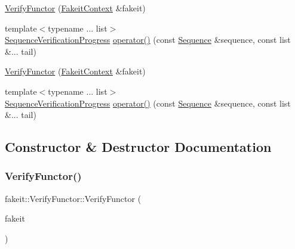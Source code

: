 \begin{DoxyCompactItemize}
\mbox{\hyperlink{classfakeit_1_1VerifyFunctor_ae85e5c4e5d0964fe41d78ffa7be7f12d}{Verify\+Functor}} (\mbox{\hyperlink{structfakeit_1_1FakeitContext}{Fakeit\+Context}} \&fakeit)
\item 
{\footnotesize template$<$typename ... list$>$ }\\\mbox{\hyperlink{classfakeit_1_1SequenceVerificationProgress}{Sequence\+Verification\+Progress}} \mbox{\hyperlink{classfakeit_1_1VerifyFunctor_a402a212d37bb558e53493cb9ab866947}{operator()}} (const \mbox{\hyperlink{classfakeit_1_1Sequence}{Sequence}} \&sequence, const list \&... tail)
\item 
\mbox{\hyperlink{classfakeit_1_1VerifyFunctor_ae85e5c4e5d0964fe41d78ffa7be7f12d}{Verify\+Functor}} (\mbox{\hyperlink{structfakeit_1_1FakeitContext}{Fakeit\+Context}} \&fakeit)
\item 
{\footnotesize template$<$typename ... list$>$ }\\\mbox{\hyperlink{classfakeit_1_1SequenceVerificationProgress}{Sequence\+Verification\+Progress}} \mbox{\hyperlink{classfakeit_1_1VerifyFunctor_a402a212d37bb558e53493cb9ab866947}{operator()}} (const \mbox{\hyperlink{classfakeit_1_1Sequence}{Sequence}} \&sequence, const list \&... tail)
\end{DoxyCompactItemize}


\subsection{Constructor \& Destructor Documentation}
\mbox{\label{classfakeit_1_1VerifyFunctor_ae85e5c4e5d0964fe41d78ffa7be7f12d}} 
\subsubsection{\texorpdfstring{VerifyFunctor()}{VerifyFunctor()}\hspace{0.1cm}{\footnotesize\ttfamily [1/9]}}
{\footnotesize\ttfamily fakeit\+::\+Verify\+Functor\+::\+Verify\+Functor (\begin{DoxyParamCaption}\item[{\mbox{\hyperlink{structfakeit_1_1FakeitContext}{Fakeit\+Context}} \&}]{fakeit }\end{DoxyParamCaption})\hspace{0.3cm}{\ttfamily [inline]}}

